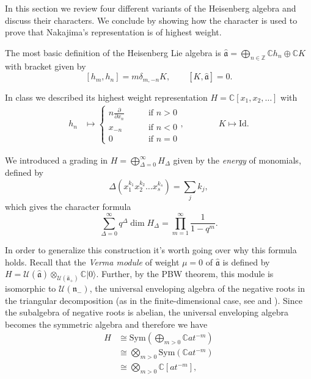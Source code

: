 \noindent
In this section we review four different
variants
of the Heisenberg algebra and discuss their
characters.
We conclude by showing how the character is
used
to prove that Nakajima's representation is
of highest weight.

\medskip\noindent
The most basic definition of the Heisenberg
Lie algebra is
$\hat{\mathfrak{a}}=
\bigoplus_{n \in \mathbb{Z}} \mathbb{C}h_n
\oplus\mathbb{C}K$
with bracket given by
\begin{equation}
\label{equation-bracket-basic}
[h_m,h_n]=m\delta_{m,-n}K,\qquad
[K,\hat{\mathfrak{a}}]=0.
\end{equation}

\noindent
In class we described its highest weight
representation
$H=\mathbb{C}[x_1,x_2,\ldots]$ with
\begin{align*}
h_n&\mapsto \begin{cases}
n \frac{\partial }{\partial x_n}\qquad
&\text{if }n>0\\
x_{-n}\qquad &\text{if }n<0\\
0\qquad &\text{if }n=0
\end{cases},
\qquad \qquad  K\mapsto \text{Id}.
\end{align*}

\noindent
We introduced a grading in
$H=\bigoplus_{\Delta=0}^\infty H_\Delta$
given by the {\it energy} of monomials,
defined by
$$
\Delta(x_1^{k_1}x_2^{k_2}\ldots
x_s^{k_s})=\sum_j k_j,
$$
which gives the character formula
\begin{equation}
\label{equation-character-heisenberg}
\sum_{\Delta=0}^\infty q^\Delta \dim H_\Delta
=\prod_{m=1}^\infty\frac{1}{1-q^m}.
\end{equation}

\noindent
In order to generalize this construction
it's worth going over why this formula holds.
Recall that the \textit{Verma module} of
weight $\mu=0$
of $\hat{\mathfrak{a}}$ is defined by
$H=
\mathcal{U}(\hat{\mathfrak{a}})
\otimes_{\mathcal{U}(\hat{\mathfrak{a}}_+)}
\mathbb{C}|0\rangle$.
Further, by the PBW theorem, this module
is isomorphic to
$\mathcal{U}(\mathfrak{n}_-)$,
the universal enveloping algebra
of the negative roots in the triangular
decomposition
(as in the finite-dimensional case, see
\cite[Lecture 24]{KLAL} and
\cite[Video 8]{videos}).
Since the subalgebra of negative roots is
abelian,
the universal enveloping algebra becomes the
symmetric algebra
and therefore we have
\begin{equation}
\label{equation-symmetric-rank-1}
\begin{aligned}
H&\cong\text{Sym}\left(\bigoplus_{m>0}\mathbb{C}at^{-m}\right)\\
&\cong\bigotimes_{m>0}\text{Sym}(\mathbb{C}at^{-m})\\
&\cong \bigotimes_{m>0}\mathbb{C}[at^{-m}],
\end{aligned}
\end{equation}

